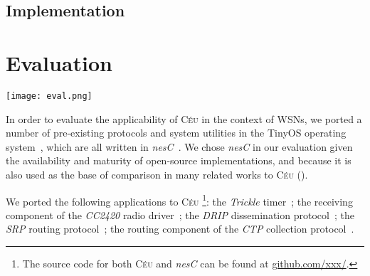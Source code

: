 \documentclass[10pt]{sensys-proc}
\newcommand{\CEU}{\textsc{C\'{e}u}\xspace}
\begin{document}
\begin{comment}
Objects
    - each method is a global function receiving a different object to 
      manipulate
    - global (usually heap)
    - garbage collected or global

Organisms
    - mutual reactivity
    - scoped / local
    - O(1) GC

- nesting
    - data
    - events
    - listeners
    - compositions

- both have an interface
- fields / methods

- fields / internal events
- public fields are ok because reliable shared memory

- no recursive definitions
- but we have interfaces
- special global interface
\end{comment}

\subsection{Implementation}

\section{Evaluation}
\label{sec.eval}

\begin{figure*}[t]
\texttt{[image: eval.png]}
\caption{ Comparison between \CEU and \emph{nesC} for the ported applications.
\label{fig.eval}
}
\end{figure*}

In order to evaluate the applicability of \CEU in the context of WSNs, we 
ported a number of pre-existing protocols and system utilities in the TinyOS 
operating system~\cite{wsn.tos}, which are all written in 
\emph{nesC}~\cite{wsn.nesc}.
We chose \emph{nesC} in our evaluation given the availability and maturity of 
open-source implementations, and because it is also used as the base of 
comparison in many related works to \CEU 
(\cite{wsn.protothreads,wsn.sol,wsn.ocram,wsn.flowtalk}).

We ported the following applications to \CEU%
\footnote{The source code for both \CEU and \emph{nesC} can be found at
\url{github.com/xxx/}.}:
the \emph{Trickle} timer~\cite{wsn.trickle};
the receiving component of the \emph{CC2420} radio driver~\cite{wsn.teps};
the \emph{DRIP} dissemination protocol~\cite{wsn.teps};
the \emph{SRP} routing protocol~\cite{wsn.teps};
the routing component of the \emph{CTP} collection protocol~\cite{wsn.ctp}.
\end{document}
